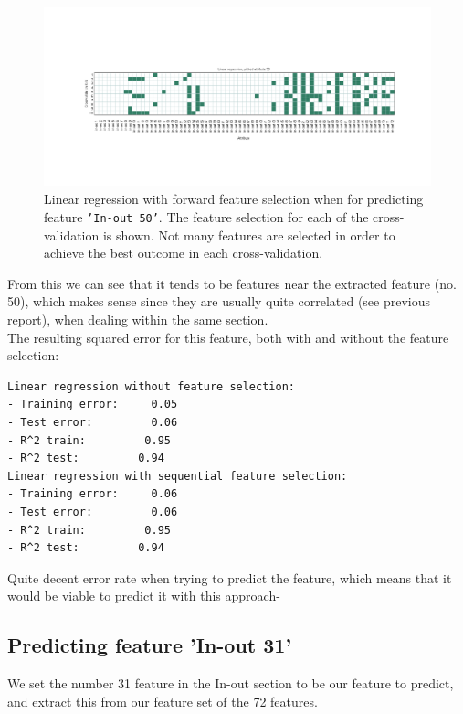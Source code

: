 \begin{figure}[H]
\centering
\includegraphics[width=\linewidth, trim= 50mm 50mm 50mm 50mm]{code/linear_regression_attr50}
\caption{Linear regression with forward feature selection when for predicting feature \texttt{'In-out 50'}. The feature selection for each of the cross-validation is shown. Not many features are selected in order to achieve the best outcome in each cross-validation.}
\label{fig:linforward_attr50}
\end{figure}

From this we can see that it tends to be features near the extracted feature (no. 50), which makes sense since they are usually quite correlated (see previous report), when dealing within the same section. \\

The resulting squared error for this feature, both with and without the feature selection:

\begin{verbatim}
Linear regression without feature selection:
- Training error:     0.05
- Test error:         0.06
- R^2 train:         0.95
- R^2 test:         0.94
Linear regression with sequential feature selection:
- Training error:     0.06
- Test error:         0.06
- R^2 train:         0.95
- R^2 test:         0.94
\end{verbatim}

Quite decent error rate when trying to predict the feature, which means that it would be viable to predict it with this approach-

\subsection*{Predicting feature 'In-out 31'}

We set the number 31 feature in the In-out section to be our feature to predict, and extract this from our feature set of the 72 features. 


